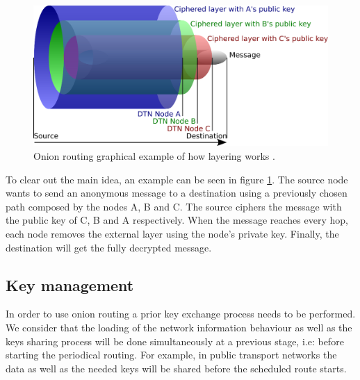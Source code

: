 \begin{figure}[hbt]
  \centering
  \includegraphics[scale=0.35]{imgs/onion}
  \caption{Onion routing graphical example of how layering works \cite{wiki-onion-routing-image}.}
  \label{fig:dtn-example}
\end{figure}

To clear out the main idea, an example can be seen in figure \ref{fig:dtn-example}. The source node wants to send an anonymous message to a destination using a previously chosen path composed by the nodes A, B and C. The source ciphers the message with the public key of C, B and A respectively. When the message reaches every hop, each node removes the external layer using the node's private key. Finally, the destination will get the fully decrypted message.

\subsection{Key management}

In order to use onion routing a prior key exchange process needs to be performed. We consider that the loading of the network information behaviour as well as the keys sharing process will be done simultaneously at a previous stage, i.e: before starting the periodical routing. For example, in public transport networks the data as well as the needed keys will be shared before the scheduled route starts.
